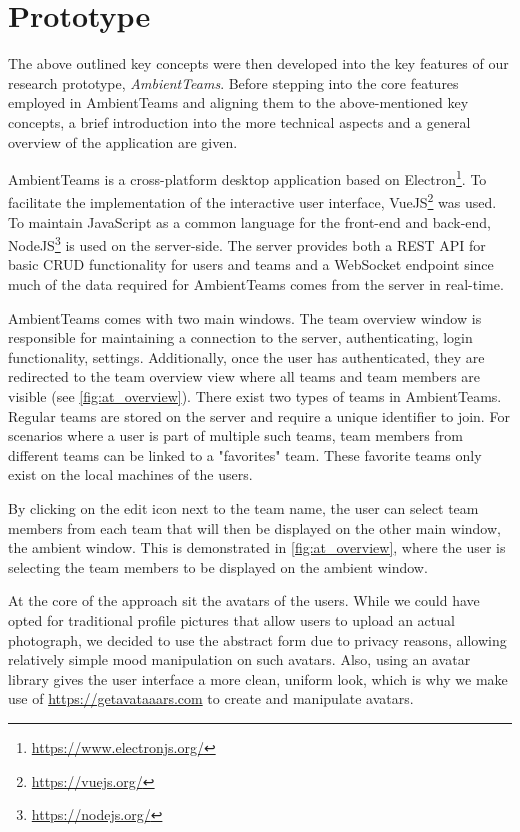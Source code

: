 \chapter{Prototype}
The above outlined key concepts were then developed into the key features of our research prototype, \textit{AmbientTeams}. Before stepping into the core features employed in AmbientTeams and aligning them to the above-mentioned key concepts, a brief introduction into the more technical aspects and a general overview of the application are given.

AmbientTeams is a cross-platform desktop application based on Electron\footnote{\url{https://www.electronjs.org/}}. To facilitate the implementation of the interactive user interface, VueJS\footnote{\url{https://vuejs.org/}} was used. To maintain JavaScript as a common language for the front-end and back-end, NodeJS\footnote{\url{https://nodejs.org/}} is used on the server-side. The server provides both a REST API for basic CRUD functionality for users and teams and a WebSocket endpoint since much of the data required for AmbientTeams comes from the server in real-time.

AmbientTeams comes with two main windows. The team overview window is responsible for maintaining a connection to the server, authenticating, login functionality, settings. Additionally, once the user has authenticated, they are redirected to the team overview view where all teams and team members are visible (see \autoref{fig:at_overview}). There exist two types of teams in AmbientTeams. Regular teams are stored on the server and require a unique identifier to join. For scenarios where a user is part of multiple such teams, team members from different teams can be linked to a "favorites" team. These favorite teams only exist on the local machines of the users.

By clicking on the edit icon next to the team name, the user can select team members from each team that will then be displayed on the other main window, the ambient window. This is demonstrated in \autoref{fig:at_overview}, where the user is selecting the team members to be displayed on the ambient window.

At the core of the approach sit the avatars of the users. While we could have opted for traditional profile pictures that allow users to upload an actual photograph, we decided to use the abstract form due to privacy reasons, allowing relatively simple mood manipulation on such avatars. Also, using an avatar library gives the user interface a more clean, uniform look, which is why
we make use of \url{https://getavataaars.com} to create and manipulate avatars.


